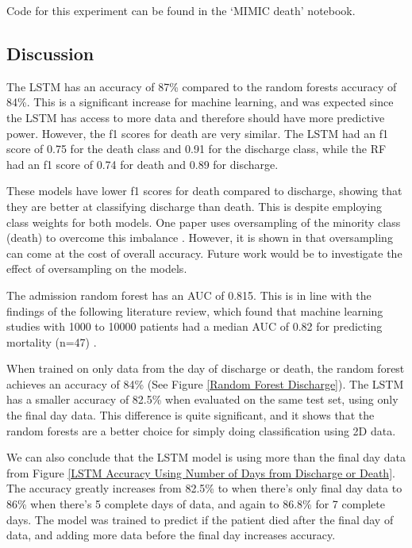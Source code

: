\documentclass[12pt]{article}
\begin{document}
Code for this experiment can be found in the `MIMIC death' notebook. 

\subsection{Discussion}

The LSTM has an accuracy of 87\% compared to the random forests accuracy of 84\%. This is a significant increase for machine learning, and was expected since the LSTM has access to more data and therefore should have more predictive power. However, the f1 scores for death are very similar. The LSTM had an f1 score of 0.75 for the death class and 0.91 for the discharge class, while the RF had an f1 score of 0.74 for death and 0.89 for discharge.

These models have lower f1 scores for death compared to discharge, showing that they are better at classifying discharge than death. This is despite employing class weights for both models. One paper uses oversampling of the minority class (death) to overcome this imbalance \cite{ICUFancyLSTM}. However, it is shown in \cite{ImbalancedData} that oversampling can come at the cost of overall accuracy. Future work would be to investigate the effect of oversampling on the models. 

The admission random forest has an AUC of 0.815. This is in line with the findings of the following literature review, which found that machine learning studies with 1000 to 10000 patients had a median AUC of 0.82 for predicting mortality (n=47) \cite{MLICUSystematicReview}. 

When trained on only data from the day of discharge or death, the random forest achieves an accuracy of 84\% (See Figure \ref{Random Forest Discharge}). The LSTM has a smaller accuracy of 82.5\% when evaluated on the same test set, using only the final day data. This difference is quite significant, and it shows that the random forests are a better choice for simply doing classification using 2D data.

We can also conclude that the LSTM model is using more than the final day data from Figure \ref{LSTM Accuracy Using Number of Days from Discharge or Death}. The accuracy greatly increases from 82.5\% to when there's only final day data to 86\% when there's 5 complete days of data, and again to 86.8\% for 7 complete days. The model was trained to predict if the patient died after the final day of data, and adding more data before the final day increases accuracy.
\end{document}
